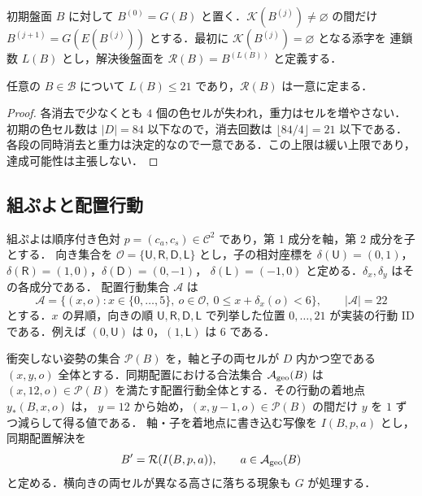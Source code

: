 初期盤面 $B$ に対して $B^{(0)}=G(B)$ と置く．$\mathcal K(B^{(j)})\ne\varnothing$ の間だけ
$B^{(j+1)}=G(E(B^{(j)}))$ とする．最初に $\mathcal K(B^{(j)})=\varnothing$ となる添字を
連鎖数 $L(B)$ とし，解決後盤面を $\mathcal R(B)=B^{(L(B))}$ と定義する．
\begin{proposition}[連鎖解決の有限性]\label{prop:finite}
任意の $B\in\mathcal B$ について $L(B)\le21$ であり，$\mathcal R(B)$ は一意に定まる．
\end{proposition}
\begin{proof}
各消去で少なくとも $4$ 個の色セルが失われ，重力はセルを増やさない．初期の色セル数は
$|D|=84$ 以下なので，消去回数は $\lfloor84/4\rfloor=21$ 以下である．
各段の同時消去と重力は決定的なので一意である．この上限は緩い上限であり，達成可能性は主張しない．
\end{proof}

\subsection{組ぷよと配置行動}
組ぷよは順序付き色対 $p=(c_a,c_s)\in\mathcal C^2$ であり，第 1 成分を軸，第 2 成分を子とする．
向き集合を $\mathcal O=\{\mathsf U,\mathsf R,\mathsf D,\mathsf L\}$ とし，子の相対座標を
$\delta(\mathsf U)=(0,1)$，$\delta(\mathsf R)=(1,0)$，$\delta(\mathsf D)=(0,-1)$，
$\delta(\mathsf L)=(-1,0)$ と定める．$\delta_x,\delta_y$ はその各成分である．
配置行動集合 $\mathcal A$ は
\begin{equation}\label{eq:actions}
 \mathcal A=\{(x,o):x\in\{0,\ldots,5\},\ o\in\mathcal O,\ 0\le x+\delta_x(o)<6\},
 \qquad |\mathcal A|=22
\end{equation}
とする．$x$ の昇順，向きの順 $\mathsf U,\mathsf R,\mathsf D,\mathsf L$ で列挙した位置
$0,\ldots,21$ が実装の行動 ID である．例えば $(0,\mathsf U)$ は $0$，$(1,\mathsf L)$ は $6$ である．

衝突しない姿勢の集合 $\mathcal P(B)$ を，軸と子の両セルが $D$ 内かつ空である
$(x,y,o)$ 全体とする．同期配置における合法集合 $\mathcal A_{\rm geo}(B)$ は
$(x,12,o)\in\mathcal P(B)$ を満たす配置行動全体とする．その行動の着地点 $y_*(B,x,o)$ は，
$y=12$ から始め，$(x,y-1,o)\in\mathcal P(B)$ の間だけ $y$ を $1$ ずつ減らして得る値である．
軸・子を着地点に書き込む写像を $I(B,p,a)$ とし，同期配置解決を
\begin{equation}\label{eq:placement}
 B'=\mathcal R(I(B,p,a)),\qquad a\in\mathcal A_{\rm geo}(B)
\end{equation}
と定める．横向きの両セルが異なる高さに落ちる現象も $G$ が処理する．

